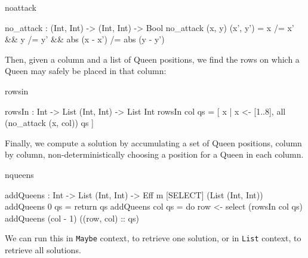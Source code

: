 \begin{SaveVerbatim}{noattack}

no_attack : (Int, Int) -> (Int, Int) -> Bool
no_attack (x, y) (x', y')
   = x /= x' && y /= y' && abs (x - x') /= abs (y - y')

\end{SaveVerbatim}

\noindent
Then, given a column and a list of Queen positions, we find the rows on which
a Queen may safely be placed in that column:

\begin{SaveVerbatim}{rowsin}

rowsIn : Int -> List (Int, Int) -> List Int
rowsIn col qs 
   = [ x | x <- [1..8], all (no_attack (x, col)) qs ]

\end{SaveVerbatim}

\noindent
Finally, we compute a solution by accumulating a set of Queen positions,
column by column, non-deterministically choosing a position for a Queen in
each column.

\begin{SaveVerbatim}{nqueens}

addQueens : Int -> List (Int, Int) -> 
            Eff m [SELECT] (List (Int, Int))
addQueens 0   qs = return qs
addQueens col qs 
   = do row <- select (rowsIn col qs)
        addQueens (col - 1) ((row, col) :: qs)

\end{SaveVerbatim}

\noindent
We can run this in \texttt{Maybe} context, to retrieve one solution, or in
\texttt{List} context, to retrieve all solutions.

